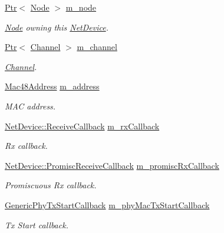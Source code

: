 \begin{DoxyCompactItemize}
\hyperlink{classns3_1_1Ptr}{Ptr}$<$ \hyperlink{classns3_1_1Node}{Node} $>$ \hyperlink{classns3_1_1AlohaNoackNetDevice_a5b4ab0f0020d7c32aa3c13415b0db277}{m\+\_\+node}
\begin{DoxyCompactList}\small\item\em \hyperlink{classns3_1_1Node}{Node} owning this \hyperlink{classns3_1_1NetDevice}{Net\+Device}. \end{DoxyCompactList}\item 
\hyperlink{classns3_1_1Ptr}{Ptr}$<$ \hyperlink{classns3_1_1Channel}{Channel} $>$ \hyperlink{classns3_1_1AlohaNoackNetDevice_a552286457f5d84322c6aca3ba43187a7}{m\+\_\+channel}
\begin{DoxyCompactList}\small\item\em \hyperlink{classns3_1_1Channel}{Channel}. \end{DoxyCompactList}\item 
\hyperlink{classns3_1_1Mac48Address}{Mac48\+Address} \hyperlink{classns3_1_1AlohaNoackNetDevice_a166639a91b87662cb798ead280bee700}{m\+\_\+address}
\begin{DoxyCompactList}\small\item\em M\+AC address. \end{DoxyCompactList}\item 
\hyperlink{classns3_1_1NetDevice_ad5e5e1ca187472bc2ba99575d8def568}{Net\+Device\+::\+Receive\+Callback} \hyperlink{classns3_1_1AlohaNoackNetDevice_a1b3e4080b2399f5cd2ddf4fc48b9da1a}{m\+\_\+rx\+Callback}
\begin{DoxyCompactList}\small\item\em Rx callback. \end{DoxyCompactList}\item 
\hyperlink{classns3_1_1NetDevice_a427225795919f26c414bee2ea3f31ed2}{Net\+Device\+::\+Promisc\+Receive\+Callback} \hyperlink{classns3_1_1AlohaNoackNetDevice_a2b1602e67228e9d99e925e633dc8b219}{m\+\_\+promisc\+Rx\+Callback}
\begin{DoxyCompactList}\small\item\em Promiscuous Rx callback. \end{DoxyCompactList}\item 
\hyperlink{namespacens3_ae7520442eb033588646b0ba04c79bdd8}{Generic\+Phy\+Tx\+Start\+Callback} \hyperlink{classns3_1_1AlohaNoackNetDevice_a7394a9903f723a3528f0e8c5f96ba908}{m\+\_\+phy\+Mac\+Tx\+Start\+Callback}
\begin{DoxyCompactList}\small\item\em Tx Start callback. \end{DoxyCompactList}\item 

\end{DoxyCompactItemize}
